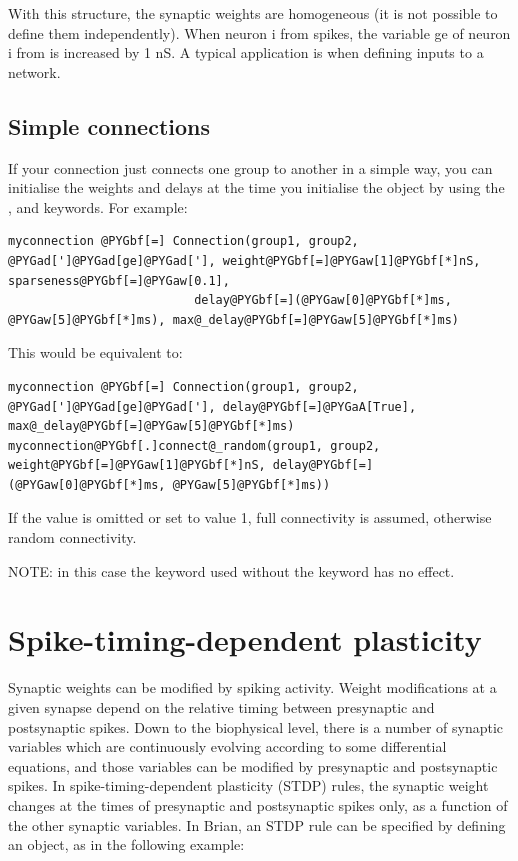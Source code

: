\documentclass[letterpaper,10pt,english]{manual}
\begin{document}
With this structure, the synaptic weights are homogeneous (it is not possible to define them
independently). When neuron i from  spikes, the variable ge of neuron i from 
is increased by 1 nS. A typical application is when defining inputs to a network.


\subsection{Simple connections}

If your connection just connects one group to another in a simple way, you can initialise
the weights and delays at the time you initialise the \hyperlink{brian.Connection}{} object by using
the ,  and  keywords. For example:

\begin{Verbatim}[commandchars=@\[\]]
myconnection @PYGbf[=] Connection(group1, group2, @PYGad[']@PYGad[ge]@PYGad['], weight@PYGbf[=]@PYGaw[1]@PYGbf[*]nS, sparseness@PYGbf[=]@PYGaw[0.1],
                          delay@PYGbf[=](@PYGaw[0]@PYGbf[*]ms, @PYGaw[5]@PYGbf[*]ms), max@_delay@PYGbf[=]@PYGaw[5]@PYGbf[*]ms)
\end{Verbatim}

This would be equivalent to:

\begin{Verbatim}[commandchars=@\[\]]
myconnection @PYGbf[=] Connection(group1, group2, @PYGad[']@PYGad[ge]@PYGad['], delay@PYGbf[=]@PYGaA[True], max@_delay@PYGbf[=]@PYGaw[5]@PYGbf[*]ms)
myconnection@PYGbf[.]connect@_random(group1, group2, weight@PYGbf[=]@PYGaw[1]@PYGbf[*]nS, delay@PYGbf[=](@PYGaw[0]@PYGbf[*]ms, @PYGaw[5]@PYGbf[*]ms))
\end{Verbatim}

If the  value is omitted or set to value 1, full connectivity is assumed,
otherwise random connectivity.

NOTE: in this case the  keyword used without the  keyword has no effect.

\resetcurrentobjects
\hypertarget{--doc-stdp}{}

\section{Spike-timing-dependent plasticity}

Synaptic weights can be modified by spiking activity.
Weight modifications at a given synapse depend on the relative
timing between presynaptic and postsynaptic spikes. Down to the
biophysical level, there is a number of synaptic variables which
are continuously evolving according to some differential equations,
and those variables can be modified by presynaptic and postsynaptic
spikes. In spike-timing-dependent plasticity (STDP) rules, the synaptic weight
changes at the times of presynaptic and postsynaptic
spikes only, as a function of the other synaptic variables.
In Brian, an STDP rule can be specified by defining an
\hyperlink{brian.STDP}{} object, as in the following example:
\end{document}
